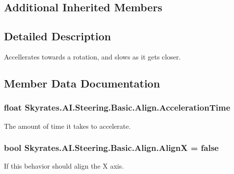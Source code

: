 \subsection*{Additional Inherited Members}


\subsection{Detailed Description}
Accellerates towards a rotation, and slows as it gets closer. 



\subsection{Member Data Documentation}
\hypertarget{class_skyrates_1_1_a_i_1_1_steering_1_1_basic_1_1_align_a6a1a2c26444037457b99c5b8397a505e}{
\subsubsection[{Acceleration\-Time}]{\setlength{\rightskip}{0pt plus 5cm}float Skyrates.\-A\-I.\-Steering.\-Basic.\-Align.\-Acceleration\-Time}}\label{class_skyrates_1_1_a_i_1_1_steering_1_1_basic_1_1_align_a6a1a2c26444037457b99c5b8397a505e}


The amount of time it takes to accelerate. 

\hypertarget{class_skyrates_1_1_a_i_1_1_steering_1_1_basic_1_1_align_a6b2e44719571584f368fc6989974a242}{
\subsubsection[{Align\-X}]{\setlength{\rightskip}{0pt plus 5cm}bool Skyrates.\-A\-I.\-Steering.\-Basic.\-Align.\-Align\-X = false}}\label{class_skyrates_1_1_a_i_1_1_steering_1_1_basic_1_1_align_a6b2e44719571584f368fc6989974a242}


If this behavior should align the X axis. 

